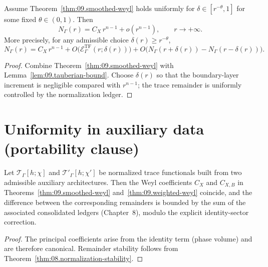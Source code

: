 \begin{theorem}\label{thm:09.sharp-weyl}
Assume Theorem~\ref{thm:09.smoothed-weyl} holds uniformly for $\delta\in[r^{-\theta},1]$ for some fixed $\theta\in(0,1)$.
Then
\begin{equation}\label{eq:09.sharp.weyl}
N_\Gamma(r)=C_X\,r^{n-1}+o(r^{n-1}),
\qquad r\to+\infty.
\end{equation}
More precisely, for any admissible choice $\delta(r)\ge r^{-\theta}$,
\begin{equation}\label{eq:09.sharp.bound}
N_\Gamma(r)
=
C_X\,r^{n-1}
+
O\!\big(\mathcal E^{\mathrm{TF}}_\Gamma(r;\delta(r))\big)
+
O\!\big(N_\Gamma(r+\delta(r))-N_\Gamma(r-\delta(r))\big).
\end{equation}
\end{theorem}

\begin{proof}
Combine Theorem~\ref{thm:09.smoothed-weyl} with Lemma~\ref{lem:09.tauberian-bound}.
Choose $\delta(r)$ so that the boundary-layer increment is negligible compared with $r^{n-1}$; the trace remainder is uniformly
controlled by the normalization ledger.
\end{proof}

\section{Uniformity in auxiliary data (portability clause)}
\label{sec:09.uniformity}

\begin{corollary}\label{cor:09.stability}
Let $\mathcal T_\Gamma[h;\chi]$ and $\mathcal T'_\Gamma[h;\chi']$ be normalized trace functionals built from two admissible
auxiliary architectures. Then the Weyl coefficients $C_X$ and $C_{X,B}$ in
Theorems~\ref{thm:09.smoothed-weyl} and~\ref{thm:09.weighted-weyl} coincide, and the difference between the corresponding remainders
is bounded by the sum of the associated consolidated ledgers (Chapter~8), modulo the explicit identity-sector correction.
\end{corollary}

\begin{proof}
The principal coefficients arise from the identity term (phase volume) and are therefore canonical. Remainder stability follows
from Theorem~\ref{thm:08.normalization-stability}.
\end{proof}


